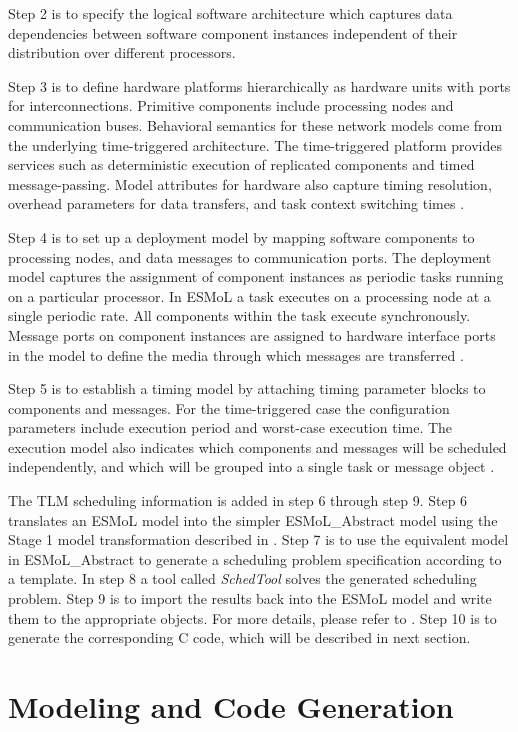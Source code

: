 \documentclass[10pt, conference, compsocconf]{IEEEtran}
\begin{document}
Step 2 is to specify the logical software architecture which captures data dependencies between software component instances independent of their distribution over different processors.

Step 3 is to define hardware platforms hierarchically as hardware units with ports for interconnections. Primitive components include processing nodes and communication buses. Behavioral semantics for these network models come from the underlying time-triggered architecture. The time-triggered platform provides services such as deterministic execution of replicated components and timed message-passing. Model attributes for hardware also capture timing resolution, overhead parameters for data transfers, and task context switching times \cite{modeling:esmol}.

Step 4 is to set up a deployment model by mapping software components to processing nodes, and data messages to communication ports. The deployment model captures the assignment of component instances as periodic tasks running on a particular processor. In ESMoL a task executes on a processing node at a single periodic rate. All components within the task execute synchronously. Message ports on component instances are assigned to hardware interface ports in the model to define the media through which messages are transferred \cite{modeling:esmol}.

Step 5 is to establish a timing model by attaching timing parameter blocks to components and messages. For the time-triggered case the configuration parameters include execution period and worst-case execution time. The execution model also indicates which components and messages will be scheduled independently, and which will be grouped into a single task or message object \cite{modeling:esmol}.

The TLM scheduling information is added in step 6 through step 9. Step 6 translates an ESMoL model into the simpler ESMoL\_Abstract model using the Stage 1 model transformation described in \cite{modeling:esmol}. Step 7 is to use the equivalent model in ESMoL\_Abstract to generate a scheduling problem specification according to a template. In step 8 a tool called \emph{SchedTool} solves the generated scheduling problem. Step 9 is to import the results back into the ESMoL model and write them to the appropriate objects. For more details, please refer to \cite{modeling:esmol}. Step 10 is to generate the corresponding C code, which will be described in next section.


\section{Modeling and Code Generation}
\end{document}
